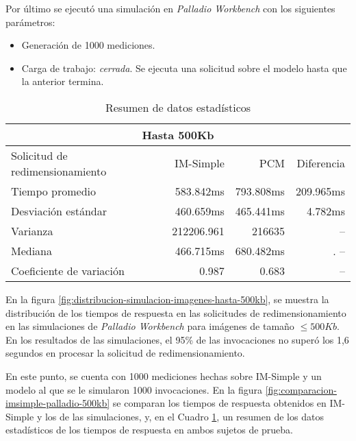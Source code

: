 Por último se ejecutó una simulación en \emph{Palladio Workbench} con los siguientes parámetros:
\begin{itemize}
    \item Generación de 1000 mediciones.
    \item Carga de trabajo: \emph{cerrada}. Se ejecuta una solicitud sobre el modelo hasta que la anterior termina. 
\end{itemize}

\begin{table}
    \centering
    \begin{tabular}{l|r|r|r}
        \toprule[1.5pt]
        \multicolumn{4}{c}{\textbf{Hasta 500Kb}} \\
        \midrule
        Solicitud de redimensionamiento  & IM-Simple & PCM & Diferencia\\
        \midrule
        Tiempo promedio  & 583.842ms & 793.808ms & 209.965ms\\
        Desviación estándar & 460.659ms & 465.441ms & 4.782ms\\
        Varianza & 212206.961 & 216635 & -- \\
        Mediana & 466.715ms & 680.482ms &. -- \\
        Coeficiente de variación & 0.987 & 0.683 & -- \\                       
        \bottomrule[1.5pt]
    \end{tabular}
    \caption{Resumen de datos estadísticos}
    \label{table:datos-estadisticos-hasta-500kb}
\end{table}

En la figura \ref{fig:distribucion-simulacion-imagenes-hasta-500kb}, se muestra la distribución de los tiempos de respuesta en las solicitudes de redimensionamiento en las simulaciones de \emph{Palladio Workbench} para imágenes de tamaño $\leq 500Kb$. En los resultados de las simulaciones, el 95\% de las invocaciones no superó los 1,6 segundos en procesar la solicitud de redimensionamiento.

En este punto, se cuenta con 1000 mediciones hechas sobre IM-Simple y un modelo al que se le simularon 1000 invocaciones. En la figura \ref{fig:comparacion-imsimple-palladio-500kb} se comparan los tiempos de respuesta obtenidos en IM-Simple y los de las simulaciones, y, en el Cuadro \ref{table:datos-estadisticos-hasta-500kb}, un resumen de los datos estadísticos de los tiempos de respuesta en ambos sujetos de prueba.

